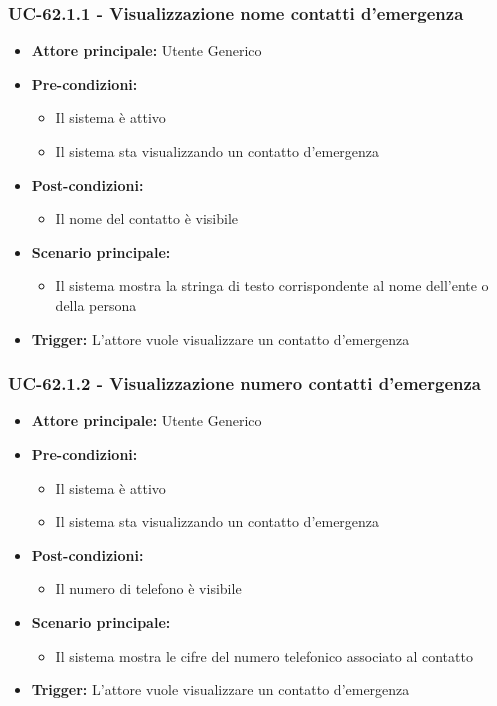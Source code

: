 \documentclass[a4paper,12pt]{article}
\begin{document}
\subsubsection{UC-62.1.1 - Visualizzazione nome contatti d'emergenza} \label{subsec:UC-62.1.1}
\begin{itemize}
    \item \textbf{Attore principale:} Utente Generico
    \item \textbf{Pre-condizioni:} 
    \begin{itemize}
        \item Il sistema è attivo
        \item Il sistema sta visualizzando un contatto d'emergenza
    \end{itemize}
    \item \textbf{Post-condizioni:}
    \begin{itemize}
        \item Il nome del contatto è visibile
    \end{itemize}
    \item \textbf{Scenario principale:} 
    \begin{itemize}
        \item Il sistema mostra la stringa di testo corrispondente al nome dell'ente o della persona
    \end{itemize}
    \item \textbf{Trigger:} L'attore vuole visualizzare un contatto d'emergenza
\end{itemize}

\subsubsection{UC-62.1.2 - Visualizzazione numero contatti d'emergenza} \label{subsec:UC-62.1.2}
\begin{itemize}
    \item \textbf{Attore principale:} Utente Generico
    \item \textbf{Pre-condizioni:} 
    \begin{itemize}
        \item Il sistema è attivo
        \item Il sistema sta visualizzando un contatto d'emergenza
    \end{itemize}
    \item \textbf{Post-condizioni:}
    \begin{itemize}
        \item Il numero di telefono è visibile
    \end{itemize}
    \item \textbf{Scenario principale:} 
    \begin{itemize}
        \item Il sistema mostra le cifre del numero telefonico associato al contatto
    \end{itemize}
    \item \textbf{Trigger:} L'attore vuole visualizzare un contatto d'emergenza
\end{itemize}
\end{document}
